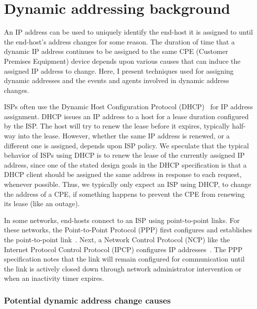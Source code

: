 
\section{Dynamic addressing background}

An IP address can be used to uniquely identify the end-host it is assigned to
until the end-host's address changes for some reason. The duration of
time that a dynamic IP address continues to be assigned to the same
CPE (Customer Premises Equipment) device depends upon various causes that can induce the assigned IP
address to change. Here, I present techniques used for
assigning dynamic addresses and the events and
agents involved in dynamic address changes.

ISPs often use the Dynamic Host Configuration Protocol
(DHCP)~\cite{rfc2131} for IP address assignment. DHCP issues an IP address to a host for a lease
duration configured by the ISP. The host will try to renew the lease
before it expires, typically half-way into the lease. However,
whether the same IP address is renewed, or a different one is
assigned, depends upon ISP policy.  We speculate that the
typical behavior of ISPs using DHCP is to renew the lease of the
currently assigned IP address, since one of the stated design goals
in the DHCP specification is that a DHCP client should be assigned the same address
in response to each request, whenever possible. Thus, we typically
only expect an ISP using DHCP, to change the address of a CPE, if
something happens to prevent the CPE from renewing its lease (like an outage).

In some networks, end-hosts connect to an ISP using
point-to-point links. For these networks, the Point-to-Point Protocol
(PPP) first configures and establishes the point-to-point link~\cite{rfc1661}. Next,
a Network Control Protocol (NCP) like the Internet Protocol Control
Protocol (IPCP) configures IP addresses~\cite{rfc1332}. The PPP specification
notes that the link will remain configured for communication until the
link is actively closed down through network administrator
intervention or when an inactivity timer expires.

\subsubsection{Potential dynamic address change causes} 

